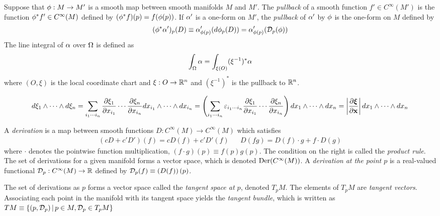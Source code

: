 \documentclass[11pt]{article}
\numberwithin{equation}{section}
\begin{document}
\begin{dfn}
Suppose that $\phi :M\rightarrow M'$ is a smooth map between smooth manifolds $M$ and $M'$.
The \textit{pullback} of a smooth function $f'\in C^\infty(M')$ is the function $\phi ^*f'\in C^\infty(M)$ defined by $(\phi ^*f)(p)=f(\phi (p))$.
If $\alpha '$ is a one-form on $M'$, the \textit{pullback} of $\alpha '$ by $\phi $ is the one-form on $M$ defined by
\begin{align}
  (\phi ^*\alpha ')_p(D)
\equiv
  \alpha '_{\phi (p)}
  (d\phi _p(D))
=
  \alpha '_{\phi (p)}
  (\mathcal{D}_p(\phi ))
\end{align}
The line integral of $\alpha $ over $\Omega $ is defined as
\begin{align}
  \int_\W
  \a
=
  \int_{\xi(O)}
  (\xi^{-1})^*\a
\end{align}
where $(O, \xi)$ is the local coordinate chart and $\xi:O\rightarrow \mb{R}^n$ and $(\xi^{-1})^*$ is the pullback to $\mathbb{R}^n$.
\end{dfn}


\begin{rmk}
\begin{align}
  d\xi_1
  \wedge
  \cd
  \wedge
  d\xi_n
=
  \sum_{i_1\cd i_n}
  \pd{\xi_1}{x_{i_1}}
  \cd
  \pd{\xi_n}{x_{i_n}}
  dx_{i_1}
  \wedge
  \cd
  \wedge
  dx_{i_n}
=
  \pr{
    \sum_{i_1\cd i_n}
    \e_{i_1\cd i_n}
    \pd{\xi_1}{x_{i_1}}
    \cd
    \pd{\xi_n}{x_{i_n}}
  }
  dx_1
  \wedge
  \cd
  \wedge
  dx_n
=
\left|
  \pd{\bm{\xi}}{\bo{x}}
\right|
  dx_1
  \wedge
  \cd
  \wedge
  dx_n
\end{align}
\end{rmk}

\newpage
\begin{dfn}
A \textit{derivation} is a map between smooth functions $D:C^\infty(M)\rightarrow C^\infty(M)$ which satisfies
\begin{align}
  (cD + c'D')(f)
=
  cD(f)
+
  c'D'(f)
&&
  D(fg)
=
  D(f)\cdot g
+
  f\cdot D(g)
\end{align}
where $\cdot$ denotes the pointwise function multiplication, $(f\cdot g)(p)\equiv f(p)g(p)$.
The condition on the right is called the \textit{product rule}.
The set of derivations for a given manifold forms a vector space, which is denoted $\mathrm{Der}(C^\infty(M))$.
A \textit{derivation at the point $p$} is a real-valued functional
$
  \mathcal{D}_p
:
  C^\infty(M)
\rightarrow
  \mathbb{R}
$
defined by
$
  \mathcal{D}_p(f)
\equiv
  \left(D(f)\right)(p)
$.
\end{dfn}


\begin{dfn}
The set of derivations as $p$ forms a vector space called the \textit{tangent space at $p$}, denoted $T_pM$.
The elements of $T_pM$ are \textit{tangent vectors}.
Associating each point in the manifold with its tangent space yields the \textit{tangent bundle}, which is written as
$
  TM
\equiv
  \{(p,\mathcal{D}_p)\,|\,p\in M, \mathcal{D}_p\in T_pM\}
$
\end{dfn}
\end{document}
